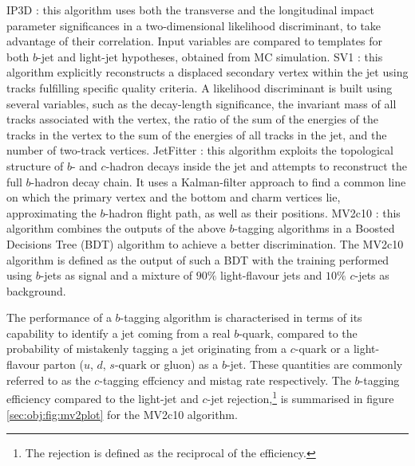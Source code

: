 \bi
\ib IP3D \cite{ref:ATLAS-CONF-2011-102}: this algorithm uses both the transverse and the longitudinal impact parameter significances in a two-dimensional likelihood discriminant, to take advantage of their correlation. Input variables are compared to templates for both $b$-jet and light-jet hypotheses, obtained from MC simulation.
\ib SV1 \cite{ref:ATLAS-CONF-2011-102}: this algorithm explicitly reconstructs a displaced secondary vertex within the jet using tracks fulfilling specific quality criteria. A likelihood discriminant is built using several variables, such as the decay-length significance, the invariant mass of all tracks associated with the vertex, the ratio of the sum of the energies of the tracks in the vertex to the sum of the energies of all tracks in the jet, and the number of two-track vertices.
\ib JetFitter \cite{JetFitter}: this algorithm exploits the topological structure of $b$- and $c$-hadron decays inside the jet and attempts to reconstruct the full $b$-hadron decay chain. It uses a Kalman-filter \cite{Fruhwirth:1987fm} approach to find a common line on which the primary vertex and the bottom and charm vertices lie, approximating the $b$-hadron flight path, as well as their positions.
\ib MV2c10 \cite{ATL-PHYS-PUB-2016-012}: this algorithm combines the outputs of the above $b$-tagging algorithms in a Boosted Decisions Tree (BDT) algorithm to achieve a better discrimination. The MV2c10 algorithm is defined as the output of such a BDT with the training performed using $b$-jets as signal and a mixture of $90\%$ light-flavour jets and $10\%$ $c$-jets as background.
\ei

The performance of a $b$-tagging algorithm is characterised in terms of its capability to identify a jet coming from a real $b$-quark, compared to the probability of mistakenly tagging a jet originating from a $c$-quark or a light-flavour parton ($u$, $d$, $s$-quark or gluon) as a $b$-jet. These quantities are commonly referred to as the $c$-tagging effciency and mistag rate respectively. The $b$-tagging efficiency compared to the light-jet and $c$-jet rejection,\footnote{The rejection is defined as the reciprocal of the efficiency.} is summarised in figure \ref{sec:obj:fig:mv2plot} for the MV2c10 algorithm.



